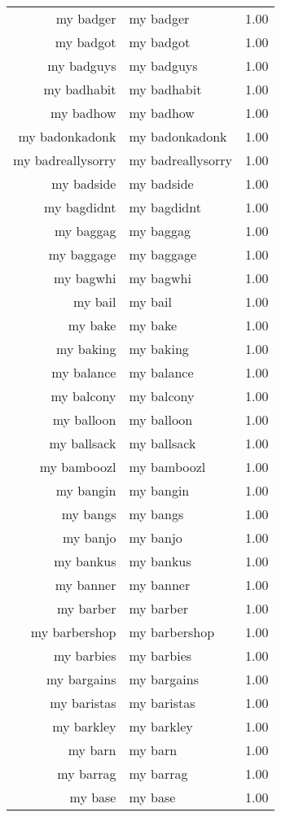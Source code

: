 \begin{table}[ht]
\begin{tabular}{rlr}
  my badger & my badger & 1.00 \\ 
  my badgot & my badgot & 1.00 \\ 
  my badguys & my badguys & 1.00 \\ 
  my badhabit & my badhabit & 1.00 \\ 
  my badhow & my badhow & 1.00 \\ 
  my badonkadonk & my badonkadonk & 1.00 \\ 
  my badreallysorry & my badreallysorry & 1.00 \\ 
  my badside & my badside & 1.00 \\ 
  my bagdidnt & my bagdidnt & 1.00 \\ 
  my baggag & my baggag & 1.00 \\ 
  my baggage & my baggage & 1.00 \\ 
  my bagwhi & my bagwhi & 1.00 \\ 
  my bail & my bail & 1.00 \\ 
  my bake & my bake & 1.00 \\ 
  my baking & my baking & 1.00 \\ 
  my balance & my balance & 1.00 \\ 
  my balcony & my balcony & 1.00 \\ 
  my balloon & my balloon & 1.00 \\ 
  my ballsack & my ballsack & 1.00 \\ 
  my bamboozl & my bamboozl & 1.00 \\ 
  my bangin & my bangin & 1.00 \\ 
  my bangs & my bangs & 1.00 \\ 
  my banjo & my banjo & 1.00 \\ 
  my bankus & my bankus & 1.00 \\ 
  my banner & my banner & 1.00 \\ 
  my barber & my barber & 1.00 \\ 
  my barbershop & my barbershop & 1.00 \\ 
  my barbies & my barbies & 1.00 \\ 
  my bargains & my bargains & 1.00 \\ 
  my baristas & my baristas & 1.00 \\ 
  my barkley & my barkley & 1.00 \\ 
  my barn & my barn & 1.00 \\ 
  my barrag & my barrag & 1.00 \\ 
  my base & my base & 1.00 \\ 

\end{tabular}
\end{table}
